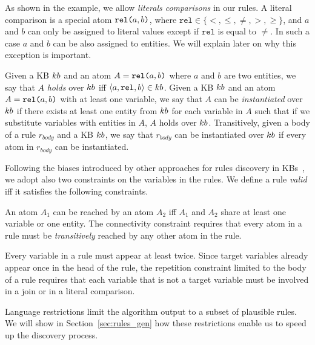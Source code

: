 As shown in the example, we allow \emph{literals comparisons} in our rules. A literal comparison is a special atom $\texttt{rel(}a,b\texttt{)}$, where $\texttt{rel} \in \{<,\leq,\neq,>,\geq\}$, and $a$ and $b$ can only be assigned to literal values except if $\texttt{rel}$ is equal to $\neq$. In such a case $a$ and $b$ can be also assigned to entities. We will explain later on why this exception is important.

Given a KB ${\sc kb}$ and an atom $A=\texttt{rel(}a,b\texttt{)}$ where $a$ and $b$ are two entities, we say that $A$ \emph{holds} over ${\sc kb}$ iff $\langle a,\texttt{rel},b\rangle \in {\sc kb}$.
Given a KB ${\sc kb}$ and an atom $A=\texttt{rel(}a,b\texttt{)}$ with at least one variable, we say that $A$ can be \emph{instantiated} over ${\sc kb}$ if there exists at least one entity from ${\sc kb}$ for each variable in $A$ such that if we substitute variables with entities in $A$, $A$ holds over ${\sc kb}$. Transitively, given a body of a rule $r_{body}$ and a KB ${\sc kb}$, we say that $r_{body}$ can be instantiated over ${\sc kb}$ if every atom in $r_{body}$ can be instantiated. 

Following the biases introduced by other approaches for rules discovery in KBs~\cite{galarraga2015fast,Chen:2016}, we adopt also two constraints on the variables in the rules.
We define a rule \emph{valid} iff it satisfies the following constraints.

\vspace{1ex}
 An atom $A_1$ can be reached by an atom $A_2$ iff $A_1$ and $A_2$ share at least one variable or one entity. The connectivity constraint requires that every atom in a rule must be \emph{transitively} reached by any other atom in the rule.

\vspace{1ex}
 Every variable in a rule must appear at least twice. Since target variables already appear once in the head of the rule, the repetition constraint limited to the body of a rule requires that each variable that is not a target variable must be involved in a join or in a literal comparison.

Language restrictions limit the algorithm output 
to a subset of plausible rules. We will show in Section~\ref{sec:rules_gen} how these restrictions enable us to speed up the discovery process. %

